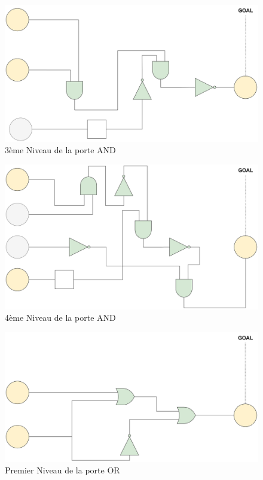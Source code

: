 \documentclass{article}
\begin{document}
\begin{figure}[h]
    \centering
    \includegraphics[width=\textwidth]{img/Levels-AND-3.jpg}
    \caption{3ème Niveau de la porte AND}
\end{figure}
\begin{figure}[h]
    \centering
    \includegraphics[width=\textwidth]{img/Levels-AND-4.jpg}
    \caption{4ème Niveau de la porte AND}
\end{figure}
\begin{figure}[h]
    \centering
    \includegraphics[width=\textwidth]{img/Levels-OR-1.jpg}
    \caption{Premier Niveau de la porte OR}
\end{figure}
\end{document}
